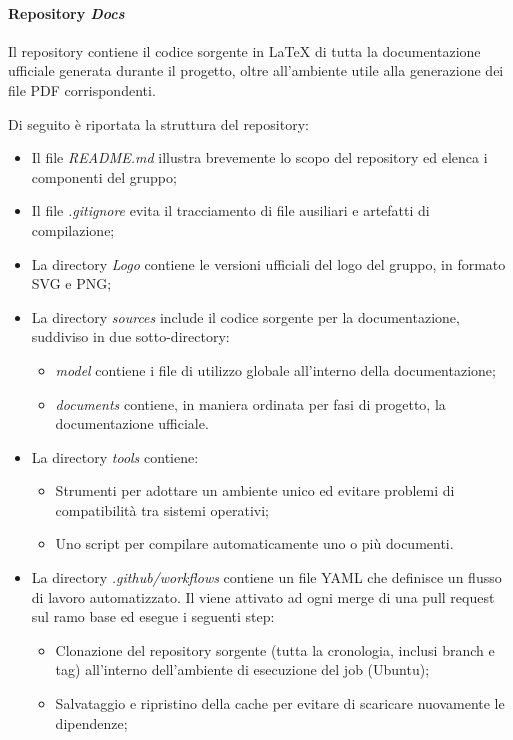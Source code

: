 \paragraph{Repository \emph{Docs}}
Il repository contiene il codice sorgente in LaTeX di tutta la documentazione ufficiale generata durante il progetto, oltre all'ambiente utile alla generazione dei file PDF corrispondenti.\\
\par Di seguito è riportata la struttura del repository:
\begin{itemize}
  \item Il file \emph{README.md} illustra brevemente lo scopo del repository ed elenca i componenti del gruppo;
  \item Il file \emph{.gitignore} evita il tracciamento di file ausiliari e artefatti di compilazione;
  \item La directory \emph{Logo} contiene le versioni ufficiali del logo del gruppo, in formato SVG e PNG;
  \item La directory \emph{sources} include il codice sorgente per la documentazione, suddiviso in due sotto-directory: 
  \begin{itemize}
    \item \emph{model} contiene i file di utilizzo globale all'interno della documentazione;
    \item \emph{documents} contiene, in maniera ordinata per fasi di progetto, la documentazione ufficiale.
  \end{itemize}
  \item La directory \emph{tools} contiene:
  \begin{itemize}
    \item Strumenti  per adottare un ambiente unico ed evitare problemi di compatibilità tra sistemi operativi;
    \item Uno script per compilare automaticamente uno o più documenti.
  \end{itemize}
  \item La directory \emph{.github/workflows} contiene un file YAML che definisce un flusso di lavoro automatizzato. Il  viene attivato ad ogni merge di una pull request sul ramo base ed esegue i seguenti step:
  \begin{itemize}
    \item Clonazione del repository sorgente (tutta la cronologia, inclusi branch e tag) all'interno dell'ambiente di esecuzione del job (Ubuntu);
    \item Salvataggio e ripristino della cache per evitare di scaricare nuovamente le dipendenze;

\end{itemize}
\end{itemize}
